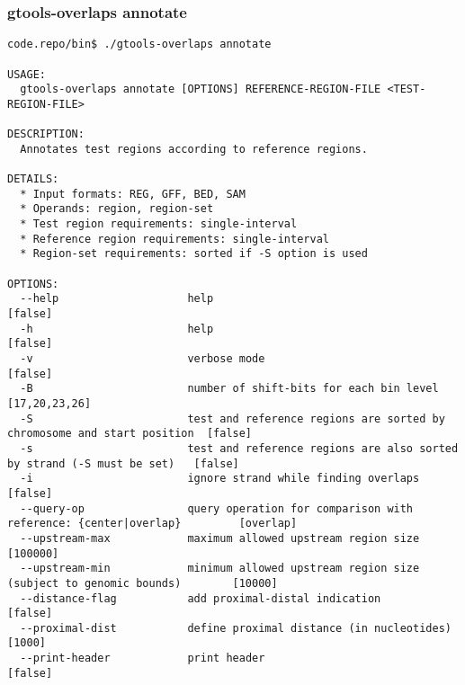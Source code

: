 \subsubsection{gtools-overlaps annotate}\label{gtools-overlaps_annotate}
\begin{lstlisting}
code.repo/bin$ ./gtools-overlaps annotate

USAGE:
  gtools-overlaps annotate [OPTIONS] REFERENCE-REGION-FILE <TEST-REGION-FILE>

DESCRIPTION:
  Annotates test regions according to reference regions.

DETAILS:
  * Input formats: REG, GFF, BED, SAM
  * Operands: region, region-set
  * Test region requirements: single-interval
  * Reference region requirements: single-interval
  * Region-set requirements: sorted if -S option is used

OPTIONS:
  --help                    help                                                                    [false]
  -h                        help                                                                    [false]
  -v                        verbose mode                                                            [false]
  -B                        number of shift-bits for each bin level                                 [17,20,23,26]
  -S                        test and reference regions are sorted by chromosome and start position  [false]
  -s                        test and reference regions are also sorted by strand (-S must be set)   [false]
  -i                        ignore strand while finding overlaps                                    [false]
  --query-op                query operation for comparison with reference: {center|overlap}         [overlap]
  --upstream-max            maximum allowed upstream region size                                    [100000]
  --upstream-min            minimum allowed upstream region size (subject to genomic bounds)        [10000]
  --distance-flag           add proximal-distal indication                                          [false]
  --proximal-dist           define proximal distance (in nucleotides)                               [1000]
  --print-header            print header                                                            [false]
\end{lstlisting}
%
